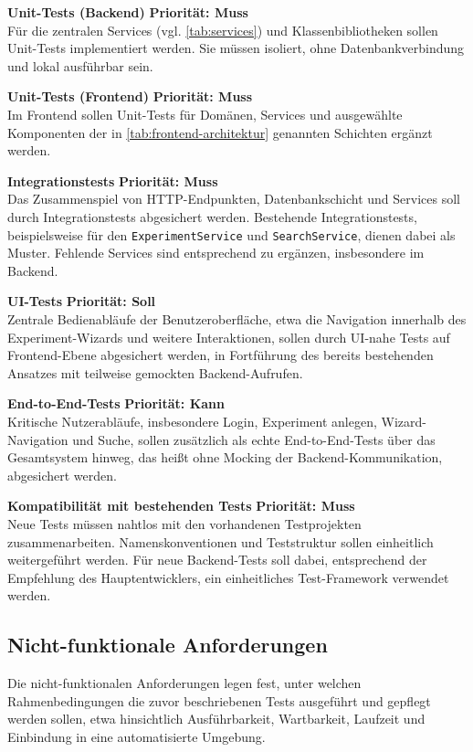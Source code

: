 \textbf{Unit-Tests (Backend)} \hfill \textbf{Priorität: Muss}\\
Für die zentralen Services (vgl. \autoref{tab:services}) und Klassenbibliotheken sollen Unit-Tests implementiert werden. Sie müssen isoliert, ohne Datenbankverbindung und lokal ausführbar sein.

\textbf{Unit-Tests (Frontend)} \hfill \textbf{Priorität: Muss}\\
Im Frontend sollen Unit-Tests für Domänen, Services und ausgewählte Komponenten der in \autoref{tab:frontend-architektur} genannten Schichten ergänzt werden.

\textbf{Integrationstests} \hfill \textbf{Priorität: Muss}\\
Das Zusammenspiel von \ac{HTTP}-Endpunkten, Datenbankschicht und Services soll durch Integrationstests abgesichert werden. Bestehende Integrationstests, beispielsweise für den \texttt{ExperimentService} und \texttt{SearchService}, dienen dabei als Muster. Fehlende Services sind entsprechend zu ergänzen, insbesondere im Backend.

\textbf{UI-Tests} \hfill \textbf{Priorität: Soll}\\
Zentrale Bedienabläufe der Benutzeroberfläche, etwa die Navigation innerhalb des Experiment-Wizards und weitere Interaktionen, sollen durch UI-nahe Tests auf Frontend-Ebene abgesichert werden, in Fortführung des bereits bestehenden Ansatzes mit teilweise gemockten Backend-Aufrufen.

\textbf{End-to-End-Tests} \hfill \textbf{Priorität: Kann}\\
Kritische Nutzerabläufe, insbesondere Login, Experiment anlegen, Wizard-Navigation und Suche, sollen zusätzlich als echte End-to-End-Tests über das Gesamtsystem hinweg, das heißt ohne Mocking der Backend-Kommunikation, abgesichert werden.

\textbf{Kompatibilität mit bestehenden Tests} \hfill \textbf{Priorität: Muss}\\
Neue Tests müssen nahtlos mit den vorhandenen Testprojekten zusammenarbeiten. Namenskonventionen und Teststruktur sollen einheitlich weitergeführt werden. Für neue Backend-Tests soll dabei, entsprechend der Empfehlung des Hauptentwicklers, ein einheitliches Test-Framework verwendet werden.

\subsection{Nicht-funktionale Anforderungen}
Die nicht-funktionalen Anforderungen legen fest, unter welchen Rahmenbedingungen die zuvor beschriebenen Tests ausgeführt und gepflegt werden sollen, etwa hinsichtlich Ausführbarkeit, Wartbarkeit, Laufzeit und Einbindung in eine automatisierte Umgebung.

